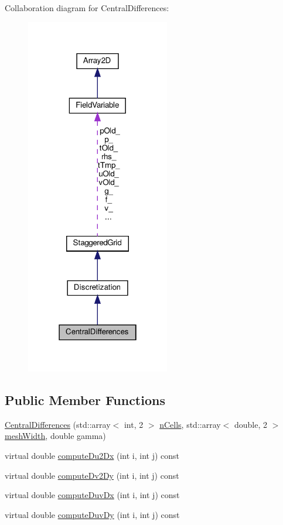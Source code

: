 Collaboration diagram for Central\+Differences\+:\nopagebreak
\begin{figure}[H]
\begin{center}
\leavevmode
\includegraphics[width=178pt]{classCentralDifferences__coll__graph}
\end{center}
\end{figure}
\subsection*{Public Member Functions}
\begin{DoxyCompactItemize}
\item 
\mbox{\hyperlink{classCentralDifferences_ac09fd44ef6658391ce08309f99774272}{Central\+Differences}} (std\+::array$<$ int, 2 $>$ \mbox{\hyperlink{classStaggeredGrid_af37816ccb2c46e4a514dedac261897bf}{n\+Cells}}, std\+::array$<$ double, 2 $>$ \mbox{\hyperlink{classStaggeredGrid_a330856d4efe952771daf0753ef84068e}{mesh\+Width}}, double gamma)
\item 
virtual double \mbox{\hyperlink{classCentralDifferences_abd31168fd39ed2d61f3459a9aa030204}{compute\+Du2\+Dx}} (int i, int j) const
\item 
virtual double \mbox{\hyperlink{classCentralDifferences_a1fc0c5d01fcc12943e1f04e1b2548c92}{compute\+Dv2\+Dy}} (int i, int j) const
\item 
virtual double \mbox{\hyperlink{classCentralDifferences_a46104c3604f533bda430fc75110c956a}{compute\+Duv\+Dx}} (int i, int j) const
\item 
virtual double \mbox{\hyperlink{classCentralDifferences_a9d2f160a453d61537ff680afc2f9e67a}{compute\+Duv\+Dy}} (int i, int j) const
\end{DoxyCompactItemize}

